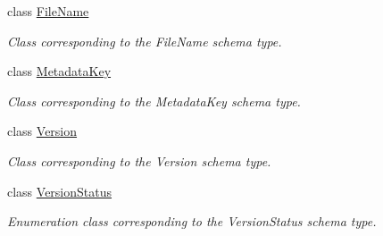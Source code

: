 \begin{DoxyCompactItemize}
class \hyperlink{classopenstack_1_1xml_1_1FileName}{FileName}
\begin{DoxyCompactList}\small\item\em Class corresponding to the FileName schema type. \item\end{DoxyCompactList}\item 
class \hyperlink{classopenstack_1_1xml_1_1MetadataKey}{MetadataKey}
\begin{DoxyCompactList}\small\item\em Class corresponding to the MetadataKey schema type. \item\end{DoxyCompactList}\item 
class \hyperlink{classopenstack_1_1xml_1_1Version}{Version}
\begin{DoxyCompactList}\small\item\em Class corresponding to the Version schema type. \item\end{DoxyCompactList}\item 
class \hyperlink{classopenstack_1_1xml_1_1VersionStatus}{VersionStatus}
\begin{DoxyCompactList}\small\item\em Enumeration class corresponding to the VersionStatus schema type. \item\end{DoxyCompactList}\end{DoxyCompactItemize}
